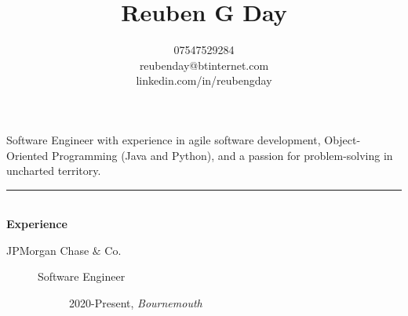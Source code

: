 \documentclass[12pt, a4paper]{article}
\date{}
\title{\vspace{-6ex}Reuben G Day }
\author{07547529284 \\ reubenday@btinternet.com \\ linkedin.com/in/reubengday} %
\begin{document}
\maketitle
\vspace{-5ex}

\begin{center}
  Software Engineer with experience in agile software development, Object-Oriented Programming (Java and Python), and a passion for problem-solving in uncharted territory.
\end{center}

\vspace{-2ex}

\noindent\rule{8cm}{0.4pt} \\
\textbf{Experience}
\begin{description}
  \item[JPMorgan Chase $\&$ Co.]\textbf{}
  \begin{description}
    \item[Software Engineer] 2020-Present, \textit{Bournemouth}

  \end{description}

\end{description}

\vspace{-2ex}
\end{document}
